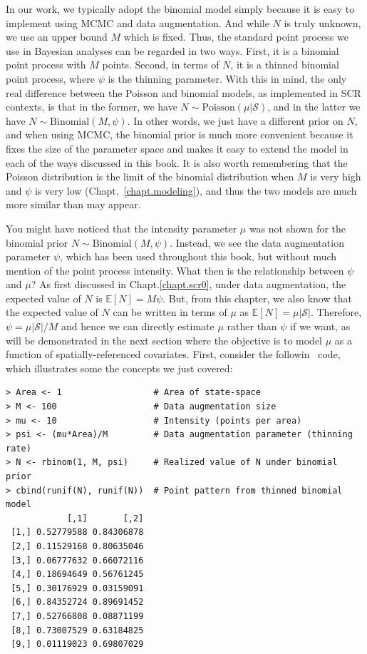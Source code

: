 In our work, we typically adopt the binomial model simply
because it is easy to implement using MCMC and data
augmentation. And while $N$ is truly unknown, we use an upper bound $M$
which is fixed. Thus, the standard point process we use in Bayesian
analyses can be
regarded in two ways. First, it is a binomial point process with $M$
points. Second, in terms of $N$, it is a thinned binomial point
process, where $\psi$ is the thinning parameter.
With this in mind,
the only real difference between the Poisson and binomial models, as
implemented in SCR contexts, is that in the former, we have
$N \sim \text{Poisson}(\mu|\mathcal{S})$, and in the latter we have
$N \sim \text{Binomial}(M, \psi)$. In other words, we just have a
different prior on $N$, and when using MCMC, the binomial prior is
much more convenient because it fixes the size of the parameter space
and makes it easy to extend the model in each of the ways discussed in
this book. It is also worth remembering that the Poisson
distribution is the limit of the binomial distribution when $M$ is
very high and $\psi$ is very low (Chapt.~\ref{chapt.modeling}), and
thus the two models are much more similar than may appear.

You might have noticed that the intensity parameter $\mu$ was not shown for the
binomial prior $N \sim \text{Binomial}(M, \psi)$. Instead, we see the
data augmentation parameter $\psi$, which has been used throughout
this book, but without much mention of the point process
intensity. What then is the relationship between $\psi$ and $\mu$?
As first discussed in Chapt.\ref{chapt.scr0}, under data augmentation,
the expected value of $N$ is $\mathbb{E}[N] = M\psi$. But, from this
chapter, we also know that the
expected value of $N$ can be written in terms of $\mu$ as
$\mathbb{E}[N] = \mu|\mathcal{S}|$. Therefore,
$\psi = \mu|\mathcal{S}| / M$ and hence we can directly estimate $\mu$
rather than $\psi$ if we want, as will be demonstrated
in the next
section where the objective is to model $\mu$ as a function of
spatially-referenced covariates. First, %
consider the followin \R~code, which illustrates some the concepts we
just covered:
\begin{small}
\begin{verbatim}
> Area <- 1                  # Area of state-space
> M <- 100                   # Data augmentation size
> mu <- 10                   # Intensity (points per area)
> psi <- (mu*Area)/M         # Data augmentation parameter (thinning rate)
> N <- rbinom(1, M, psi)     # Realized value of N under binomial prior
> cbind(runif(N), runif(N))  # Point pattern from thinned binomial model
            [,1]       [,2]
 [1,] 0.52779588 0.84306878
 [2,] 0.11529168 0.80635046
 [3,] 0.06777632 0.66072116
 [4,] 0.18694649 0.56761245
 [5,] 0.30176929 0.03159091
 [6,] 0.84352724 0.89691452
 [7,] 0.52766808 0.08871199
 [8,] 0.73007529 0.63184825
 [9,] 0.01119023 0.69807029
\end{verbatim}
\end{small}


